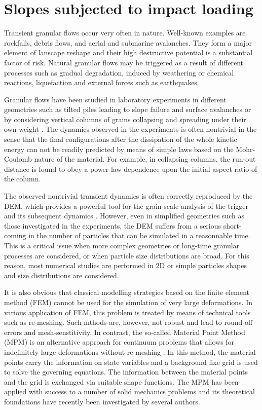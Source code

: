 \section{Slopes subjected to impact loading}


Transient granular flows occur very often in nature. 
Well-known examples are rockfalls, debris flows, 
and aerial and submarine avalanches. They form a major element of 
lanscape reshape and their high destructive potential is a 
substantial factor of risk. Natural granular flows may be triggered 
as a result of different processes such as gradual degradation,   
induced by weathering or chemical reactions, liquefaction    
and external forces such as earthquakes.          

Granular flows have been studied in laboratory experiments in different 
geometries such as tilted piles leading to slope failure and surface avalanches 
\citep{Legros2002, Iverson1997} or by considering vertical columns 
of grains collapsing and spreading under their own weight 
\citep{Lajeunesse2004, 
Lajeunesse2005}. The dynamics observed in the experiments is often nontrivial 
in the sense that the final configurations after the dissipation of the whole 
kinetic energy  
can not be readily predicted by means of simple laws based on the Mohr-Coulomb 
nature 
of the material. For example, in collapsing columns, the run-out distance 
is found to obey a power-law dependence upon the initial aspect ratio of the 
column. 

The observed nontrivial transient dynamics is often correctly 
reproduced by the DEM, which provides 
a powerful tool for the grain-scale analysis of the 
trigger and its subsequent dynamics \citep{Staron2005, Staron2009}. 
However, even in simplified geometries such as those 
investigated in the experiments, the DEM suffers from a serious 
short-coming in the number of particles that can be simulated in 
a reasonnable time. This is a critical issue when more complex geometries or 
long-time granular processes are considered, or when particle size 
distributions are broad. For this reason, most numerical studies 
are performed in 2D or simple particles shapes and size distributions 
are considered. 

It is also obvious that classical modelling strategies based on 
the finite element method (FEM) cannot be used for the 
simulation of very large deformations. In various application of FEM, 
this problem is treated by means of technical tools such 
as re-meshing. Such mthods are, however, not robust and lead 
to round-off errors and mesh-senstitivity. In contrast, the so-called 
Material Point Method (MPM) is an alternative approach for 
continuum problems that allows for indefinitely large deformations 
without re-meshing \cite{Sulski??}. In this method, the material points carry 
the information 
on state variables and a background fixe grid is used to solve the governing 
equations. 
The information between the material points and the grid is exchanged via 
suitable shape functions. The MPM has been applied with success to 
a number of solid mechanics problems and its theoretical foundations 
have recently been investigated by several authors. 

